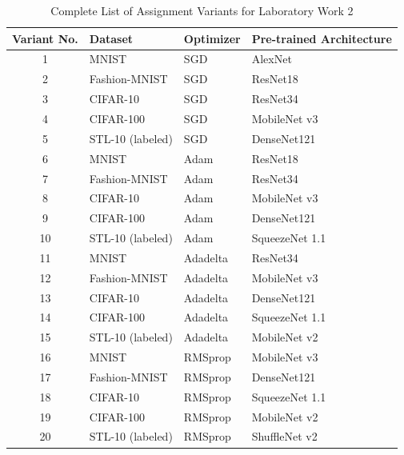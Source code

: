 \documentclass[12pt, a4paper]{article}
\begin{document}
\begin{table}[htpb]
    \centering
    \caption{Complete List of Assignment Variants for Laboratory Work 2}
    \label{tab:all_variants_lab2}
    \renewcommand{\arraystretch}{1.2}
    \begin{tabular}{clll}
        \toprule
        \textbf{Variant No.} & \textbf{Dataset} & \textbf{Optimizer} & \textbf{Pre-trained Architecture} \\
        \midrule
        1 & MNIST & SGD & AlexNet \\
        2 & Fashion-MNIST & SGD & ResNet18 \\
        3 & CIFAR-10 & SGD & ResNet34 \\
        4 & CIFAR-100 & SGD & MobileNet v3 \\
        5 & STL-10 (labeled) & SGD & DenseNet121 \\
        \midrule
        6 & MNIST & Adam & ResNet18 \\
        7 & Fashion-MNIST & Adam & ResNet34 \\
        8 & CIFAR-10 & Adam & MobileNet v3 \\
        9 & CIFAR-100 & Adam & DenseNet121 \\
        10 & STL-10 (labeled) & Adam & SqueezeNet 1.1 \\
        \midrule
        11 & MNIST & Adadelta & ResNet34 \\
        12 & Fashion-MNIST & Adadelta & MobileNet v3 \\
        13 & CIFAR-10 & Adadelta & DenseNet121 \\
        14 & CIFAR-100 & Adadelta & SqueezeNet 1.1 \\
        15 & STL-10 (labeled) & Adadelta & MobileNet v2 \\
        \midrule
        16 & MNIST & RMSprop & MobileNet v3 \\
        17 & Fashion-MNIST & RMSprop & DenseNet121 \\
        18 & CIFAR-10 & RMSprop & SqueezeNet 1.1 \\
        19 & CIFAR-100 & RMSprop & MobileNet v2 \\
        20 & STL-10 (labeled) & RMSprop & ShuffleNet v2 \\
        \bottomrule
    \end{tabular}
\end{table}
\end{document}
